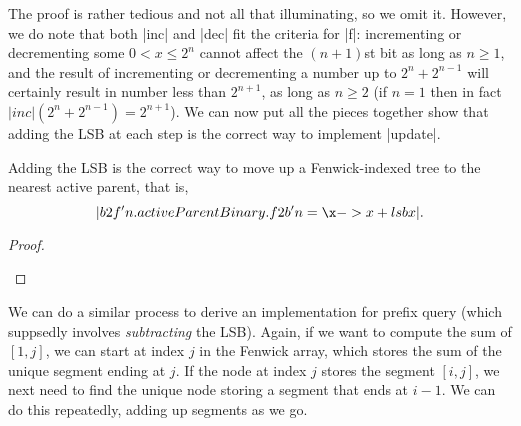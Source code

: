 The proof is rather tedious and not all that illuminating, so we omit
it.  However, we do note that both |inc| and |dec| fit the criteria
for |f|: incrementing or decrementing some $0 < x \leq 2^n$ cannot affect
the $(n+1)$st bit as long as $n \geq 1$, and the result of
incrementing or decrementing a number up to $2^n + 2^{n-1}$ will
certainly result in number less than $2^{n+1}$, as long as $n \geq 2$
(if $n=1$ then in fact $|inc| (2^n + 2^{n-1}) = 2^{n+1}$).  We can now
put all the pieces together show that adding the LSB at each step is
the correct way to implement |update|.

\begin{thm}
  Adding the LSB is the correct way to move up a Fenwick-indexed tree
  to the nearest active parent, that is,
  \[ |b2f' n . activeParentBinary . f2b' n = \x -> x + lsb x|. \]
\end{thm}
\begin{proof}
\begin{sproof}
\end{sproof}
\vspace{-3\baselineskip}
\end{proof}

We can do a similar process to derive an implementation for prefix
query (which suppsedly involves \emph{subtracting} the LSB).  Again, if we
want to compute the sum of $[1, j]$, we can start at index $j$ in the
Fenwick array, which stores the sum of the unique segment ending at
$j$.  If the node at index $j$ stores the segment $[i,j]$, we next
need to find the unique node storing a segment that ends at $i-1$.  We
can do this repeatedly, adding up segments as we go.

